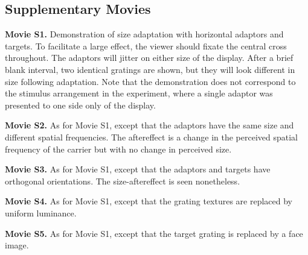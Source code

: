 \documentclass[
]{article}
\begin{document}
\hypertarget{supplementary-movies}{%
\subsection*{Supplementary Movies}\label{supplementary-movies}}

\textbf{Movie S1.} Demonstration of size adaptation with horizontal adaptors and targets. To facilitate a large effect, the viewer should fixate the central cross throughout. The adaptors will jitter on either size of the display. After a brief blank interval, two identical gratings are shown, but they will look different in size following adaptation. Note that the demonstration does not correspond to the stimulus arrangement in the experiment, where a single adaptor was presented to one side only of the display.

\textbf{Movie S2.} As for Movie S1, except that the adaptors have the same size and different spatial frequencies. The aftereffect is a change in the perceived spatial frequency of the carrier but with no change in perceived size.

\textbf{Movie S3.} As for Movie S1, except that the adaptors and targets have orthogonal orientations. The size-aftereffect is seen nonetheless.

\textbf{Movie S4.} As for Movie S1, except that the grating textures are replaced by uniform luminance.

\textbf{Movie S5.} As for Movie S1, except that the target grating is replaced by a face image.
\end{document}
